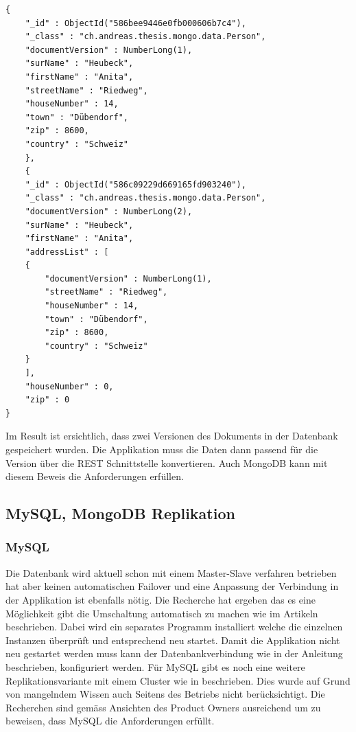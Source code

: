 \begin{lstlisting}
{
	"_id" : ObjectId("586bee9446e0fb000606b7c4"),
	"_class" : "ch.andreas.thesis.mongo.data.Person",
	"documentVersion" : NumberLong(1),
	"surName" : "Heubeck",
	"firstName" : "Anita",
	"streetName" : "Riedweg",
	"houseNumber" : 14,
	"town" : "Dübendorf",
	"zip" : 8600,
	"country" : "Schweiz"
	},
	{
	"_id" : ObjectId("586c09229d669165fd903240"),
	"_class" : "ch.andreas.thesis.mongo.data.Person",
	"documentVersion" : NumberLong(2),
	"surName" : "Heubeck",
	"firstName" : "Anita",
	"addressList" : [
	{
		"documentVersion" : NumberLong(1),
		"streetName" : "Riedweg",
		"houseNumber" : 14,
		"town" : "Dübendorf",
		"zip" : 8600,
		"country" : "Schweiz"
	}	
	],
	"houseNumber" : 0,
	"zip" : 0
}
\end{lstlisting}
Im Result ist ersichtlich, dass zwei Versionen des Dokuments in der Datenbank gespeichert wurden. Die Applikation muss die Daten dann passend für die Version über die REST Schnittstelle konvertieren. Auch MongoDB kann mit diesem Beweis die Anforderungen erfüllen.

\subsection{MySQL, MongoDB Replikation}

\subsubsection{MySQL}

Die Datenbank wird aktuell schon mit einem Master-Slave verfahren betrieben hat aber keinen automatischen Failover und eine Anpassung der Verbindung in der Applikation ist ebenfalls nötig. Die Recherche hat ergeben das es eine Möglichkeit gibt die Umschaltung automatisch zu machen wie im Artikeln \cite{mysqlrep} beschrieben. Dabei wird ein separates Programm installiert welche die einzelnen Instanzen überprüft und entsprechend neu startet. Damit die Applikation nicht neu gestartet werden muss kann der Datenbankverbindung wie in der Anleitung \cite{mysqljdbc} beschrieben, konfiguriert werden. Für MySQL gibt es noch eine weitere Replikationsvariante mit einem Cluster wie in \cite{mysqlcluster} beschrieben. Dies wurde auf Grund von mangelndem Wissen auch Seitens des Betriebs nicht berücksichtigt. Die Recherchen sind gemäss Ansichten des Product Owners ausreichend um zu beweisen, dass MySQL die Anforderungen erfüllt.

